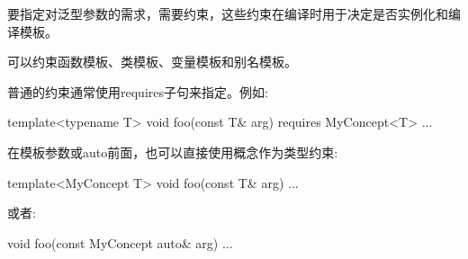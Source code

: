 要指定对泛型参数的需求，需要约束，这些约束在编译时用于决定是否实例化和编译模板。

可以约束函数模板、类模板、变量模板和别名模板。

普通的约束通常使用requires子句来指定。例如:

\begin{cpp}
template<typename T>
void foo(const T& arg)
requires MyConcept<T>
...
\end{cpp}

在模板参数或auto前面，也可以直接使用概念作为类型约束:

\begin{cpp}
template<MyConcept T>
void foo(const T& arg)
...
\end{cpp}

或者:

\begin{cpp}
void foo(const MyConcept auto& arg)
...
\end{cpp}












